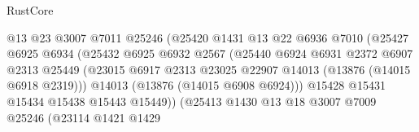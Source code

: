 \begin{lexlean}{RustCore}
\begin{coremodule}
                                        @13
                                        @23
                                        @3007
                                        @7011
                                        @25246
                                        (@25420
                                          @1431
                                          @13
                                          @22
                                          @6936
                                          @7010
                                          (@25427
                                            @6925
                                            @6934
                                            (@25432
                                              @6925
                                              @6932
                                              @2567
                                              (@25440
                                                @6924
                                                @6931
                                                @2372
                                                @6907
                                                @2313
                                                @25449
                                                (@23015
                                                  @6917
                                                  @2313
                                                  @23025
                                                  @22907
                                                  @14013
                                                  (@13876 (@14015 @6918 @2319)))
                                                @14013
                                                (@13876 (@14015 @6908 @6924)))
                                              @15428
                                              @15431
                                              @15434
                                              @15438
                                              @15443
                                              @15449))
                                          (@25413
                                            @1430
                                            @13
                                            @18
                                            @3007
                                            @7009
                                            @25246
                                            (@23114
                                              @1421
                                              @1429

\end{coremodule}
\end{lexlean}

